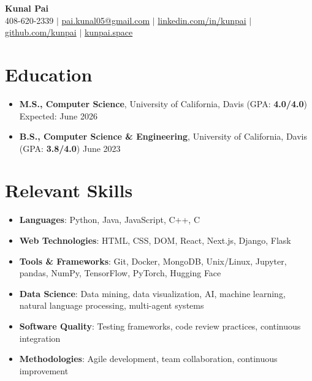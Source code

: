 \documentclass[letterpaper,10pt]{article}
\begin{document}
{\Large
\begin{center}
  \textbf{\Huge Kunal Pai} \\
  \small 408-620-2339 $|$ \href{mailto:pai.kunal05@gmail.com}{pai.kunal05@gmail.com} $|$ 
  \href{https://linkedin.com/in/kunpai}{linkedin.com/in/kunpai} $|$
  \href{https://github.com/kunpai}{github.com/kunpai} $|$
  \href{https://www.kunpai.space}{kunpai.space}
\end{center}
}

\section{Education}
{\normalsize
\begin{itemize}[leftmargin=0.15in, label={}, itemsep=0pt]
  \item \textbf{M.S., Computer Science}, University of California, Davis (GPA: \textbf{4.0/4.0}) \hfill Expected: June 2026
  \item \textbf{B.S., Computer Science \& Engineering}, University of California, Davis (GPA: \textbf{3.8/4.0}) \hfill June 2023
\end{itemize}
}

\section{Relevant Skills}
{\normalsize
\begin{itemize}[leftmargin=0.15in, label={}, itemsep=0pt]
  \item \textbf{Languages}: Python, Java, JavaScript, C++, C
  \item \textbf{Web Technologies}: HTML, CSS, DOM, React, Next.js, Django, Flask
  \item \textbf{Tools \& Frameworks}: Git, Docker, MongoDB, Unix/Linux, Jupyter, pandas, NumPy, TensorFlow, PyTorch, Hugging Face
  \item \textbf{Data Science}: Data mining, data visualization, AI, machine learning, natural language processing, multi-agent systems
  \item \textbf{Software Quality}: Testing frameworks, code review practices, continuous integration
  \item \textbf{Methodologies}: Agile development, team collaboration, continuous improvement
\end{itemize}
}
\end{document}
